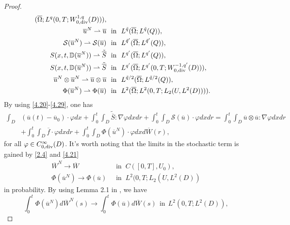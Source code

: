 \documentclass[reqno]{amsart}
\theoremstyle{definition}
\theoremstyle{remark}
\numberwithin{equation}{section} \allowdisplaybreaks
\begin{document}
\begin{proof}
\begin{align}
(\overline{\Omega};L^q(0,T;W_{0,\rm{div}}^{1,q}(D))),\\
\label{4.30}  \overline{u}^N\rightharpoonup \overline{u}&  ~\mbox{
in }~   L^{\tilde{q}}(\overline{\Omega};L^{\tilde{q}}(Q)),
\\
\label{4.31} \mathcal{S}(\overline{u}^N)\rightharpoonup
\mathcal{S}(\overline{u})& ~\mbox{ in }~
L^{\tilde{q}'}(\overline{\Omega};L^{\tilde{q}'}(Q)),
\\
\label{4.32} S(x,t,\mathbb{D}(\overline{u}^N)) \rightharpoonup
\tilde{\overline{S}}&  ~\mbox{ in }~
L^{q'}(\overline{\Omega};L^{q'}(Q)),
\\
\label{4.33} S(x,t,\mathbb{D}(\overline{u}^N)) \rightharpoonup
\tilde{\overline{S}}&  ~\mbox{ in }~
L^{q'}(\overline{\Omega};L^{q'}(0,T;W_{0,\rm{div}}^{-1,q'}(D))),\\
\label{4.34} \overline{u}^N\otimes \overline{u}^N\rightharpoonup
\overline{u}\otimes \overline{u}&  ~\mbox{ in }~
L^{\tilde{q}/2}(\overline{\Omega};L^{\tilde{q}/2}(Q)),\\
\label{4.35} \Phi(\overline{u}^N)\rightharpoonup \Phi(\overline{u})&
~\mbox{ in }~   L^2 (\overline{\Omega};L^2(0,T;L_2({U},L^2(D)))).
\end{align} By using \eqref{4.20}-\eqref{4.29}, one has
\begin{equation}\label{4.36}
\begin{split}
\int_{D}&(\overline{u}(t)-\overline{u}_0)\cdot \varphi
dx+\int_0^t\!\!\!\int_{D}\tilde{\overline{S}}:\nabla\varphi
dxdr+\int_0^t\!\!\!\int_{D}\mathcal{S}(\overline{u})\cdot \varphi
dxdr=\int_0^t\!\!\!\int_{D}\overline{u}\otimes \overline{u}
:\nabla\varphi dxdr\\
&+\int_0^t\!\!\!\int_{D}\overline{f}\cdot\varphi
dxdr+\int_0^t\!\!\!\int_{D}\Phi(\overline{u}^N)\cdot \varphi
dxd\overline{W}(r),
\end{split}
\end{equation}
for all $\varphi\in C^{\infty}_{0,\rm{div}}(D)$. It's worth noting
that the limits in the stochastic term is gained by \eqref{2.4} and
\eqref{4.21}
\begin{align*}
\overline{W}^N\rightarrow \overline{W}&  ~\mbox{ in }~
C([0,T],{U}_0),\\
 \Phi(\overline{u}^N)\rightarrow \Phi(\overline{u})&
~\mbox{ in }~ L^2(0,T;L_2({U},L^2(D))
\end{align*}
in probability. By  using Lemma 2.1 in \cite{ADNGRT}, we have
$$\int_0^t\Phi(\overline{u}^N)d\overline{W}^N(s)\rightarrow\int_0^t\Phi(\overline{u})d\overline{W}(s)\ \ \mbox{in}\ \  L^2(0,T;L^2(D)), $$

\end{proof}
\end{document}

